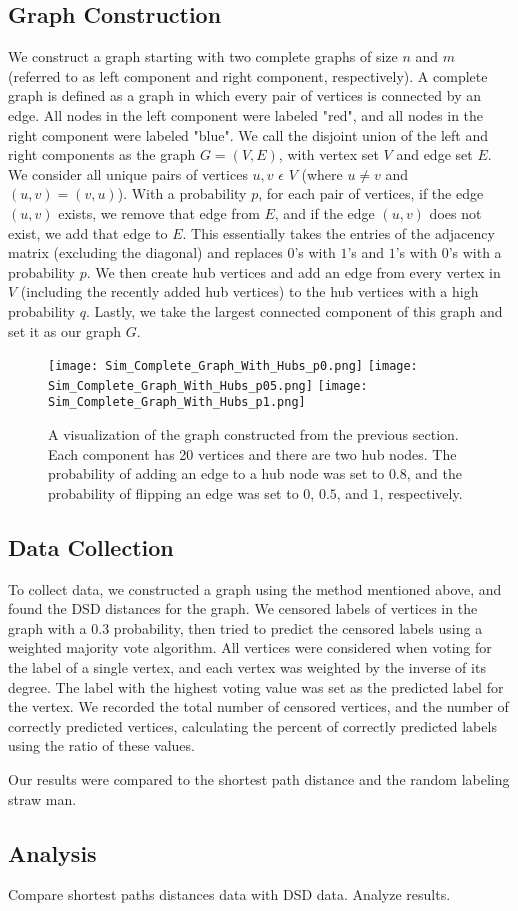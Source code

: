 \subsection{Graph Construction}
We construct a graph starting with two complete graphs of size $n$ and $m$ (referred to as left component and right component, respectively). A complete graph is defined as a graph in which every pair of vertices is connected by an edge. All nodes in the left component were labeled "red", and all nodes in the right component were labeled "blue". We call the disjoint union of the left and right components as the graph $G = (V,E)$, with vertex set $V$ and edge set $E$. We consider all unique pairs of vertices $u,v$ $\epsilon$ $V$ (where $u \neq v$ and $(u,v)=(v,u)$). With a probability $p$, for each pair of vertices, if the edge $(u,v)$ exists, we remove that edge from $E$, and if the edge $(u,v)$ does not exist, we add that edge to $E$. This essentially takes the entries of the adjacency matrix (excluding the diagonal) and replaces $0$'s with $1$'s and $1$'s with $0$'s with a probability $p$. We then create hub vertices and add an edge from every vertex in $V$ (including the recently added hub vertices) to the hub vertices with a high probability $q$. Lastly, we take the largest connected component of this graph and set it as our graph $G$.

\begin{figure}[h!]
\centering
\texttt{[image: Sim\_Complete\_Graph\_With\_Hubs\_p0.png]}
\texttt{[image: Sim\_Complete\_Graph\_With\_Hubs\_p05.png]}
\texttt{[image: Sim\_Complete\_Graph\_With\_Hubs\_p1.png]}
\caption{A visualization of the graph constructed from the previous section. Each component has 20 vertices and there are two hub nodes. The probability of adding an edge to a hub node was set to $0.8$, and the probability of flipping an edge was set to $0$, $0.5$, and $1$, respectively.}
\label{fig:complete_graph_with_hubs_1}
\end{figure}

\subsection{Data Collection}
To collect data, we constructed a graph using the method mentioned above, and found the DSD distances for the graph. We censored labels of vertices in the graph with a $0.3$ probability, then tried to predict the censored labels using a weighted majority vote algorithm. All vertices were considered when voting for the label of a single vertex, and each vertex was weighted by the inverse of its degree. The label with the highest voting value was set as the predicted label for the vertex. We recorded the total number of censored vertices, and the number of correctly predicted vertices, calculating the percent of correctly predicted labels using the ratio of these values.

Our results were compared to the shortest path distance and the random labeling straw man.



\subsection{Analysis}
\noindent
Compare shortest paths distances data with DSD data. Analyze results.

